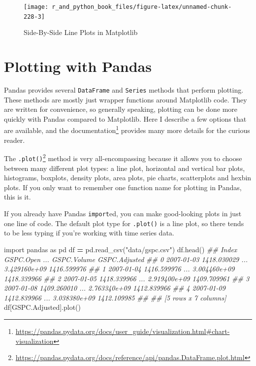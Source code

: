 \documentclass[
  12pt,
  krantz2]{krantz}
\makeatletter
\newenvironment{Shaded}{\begin{snugshade}}{\end{snugshade}}
\newcommand{\CommentTok}[1]{\textcolor[rgb]{0.37,0.37,0.37}{\textit{#1}}}
\newcommand{\ImportTok}[1]{#1}
\newcommand{\NormalTok}[1]{#1}
\newcommand{\OperatorTok}[1]{\textcolor[rgb]{0.43,0.43,0.43}{\textbf{#1}}}
\newcommand{\StringTok}[1]{\textcolor[rgb]{0.5,0.5,0.5}{#1}}
\renewcommand{\href}[2]{#2\footnote{\url{#1}}}
\newenvironment{kframe}{%
\medskip{}
\setlength{\fboxsep}{.8em}
 \def\at@end@of@kframe{}%
 \ifinner\ifhmode%
  \def\at@end@of@kframe{\end{minipage}}%
  \begin{minipage}{\columnwidth}%
 \fi\fi%
 \def\FrameCommand##1{\hskip\@totalleftmargin \hskip-\fboxsep
 \colorbox{shadecolor}{##1}\hskip-\fboxsep
     \hskip-\linewidth \hskip-\@totalleftmargin \hskip\columnwidth}%
 \MakeFramed {\advance\hsize-\width
   \@totalleftmargin\z@ \linewidth\hsize
   \@setminipage}}%
 {\par\unskip\endMakeFramed%
 \at@end@of@kframe}
\renewenvironment{Shaded}{\begin{kframe}}{\end{kframe}}
\makeatother
\begin{document}
\begin{figure}
\texttt{[image: r\_and\_python\_book\_files/figure-latex/unnamed-chunk-228-3]} \caption{Side-By-Side Line Plots in Matplotlib}\label{fig:unnamed-chunk-228}
\end{figure}

\hypertarget{plotting-with-pandas}{%
\section{Plotting with Pandas}\label{plotting-with-pandas}}

Pandas provides several \texttt{DataFrame} and \texttt{Series} methods that perform plotting. These methods are mostly just wrapper functions around Matplotlib code. They are written for convenience, so generally speaking, plotting can be done more quickly with Pandas compared to Matplotlib. Here I describe a few options that are available, and \href{https://pandas.pydata.org/docs/user_guide/visualization.html\#chart-visualization}{the documentation} provides many more details for the curious reader.

The \href{https://pandas.pydata.org/docs/reference/api/pandas.DataFrame.plot.html}{\texttt{.plot()}} method is very all-encompassing because it allows you to choose between many different plot types: a line plot, horizontal and vertical bar plots, histograms, boxplots, density plots, area plots, pie charts, scatterplots and hexbin plots. If you only want to remember one function name for plotting in Pandas, this is it.

If you already have Pandas \texttt{import}ed, you can make good-looking plots in just one line of code. The default plot type for \texttt{.plot()} is a line plot, so there tends to be less typing if you're working with time series data.

\begin{Shaded}
\begin{Highlighting}[]
\ImportTok{import}\NormalTok{ pandas }\ImportTok{as}\NormalTok{ pd}
\NormalTok{df }\OperatorTok{=}\NormalTok{ pd.read\_csv(}\StringTok{"data/gspc.csv"}\NormalTok{)}
\NormalTok{df.head()}
\CommentTok{\#\#         Index    GSPC.Open  ...   GSPC.Volume  GSPC.Adjusted}
\CommentTok{\#\# 0  2007{-}01{-}03  1418.030029  ...  3.429160e+09    1416.599976}
\CommentTok{\#\# 1  2007{-}01{-}04  1416.599976  ...  3.004460e+09    1418.339966}
\CommentTok{\#\# 2  2007{-}01{-}05  1418.339966  ...  2.919400e+09    1409.709961}
\CommentTok{\#\# 3  2007{-}01{-}08  1409.260010  ...  2.763340e+09    1412.839966}
\CommentTok{\#\# 4  2007{-}01{-}09  1412.839966  ...  3.038380e+09    1412.109985}
\CommentTok{\#\# }
\CommentTok{\#\# [5 rows x 7 columns]}
\NormalTok{df[}\StringTok{\textquotesingle{}GSPC.Adjusted\textquotesingle{}}\NormalTok{].plot()}
\end{Highlighting}
\end{Shaded}
\end{document}
